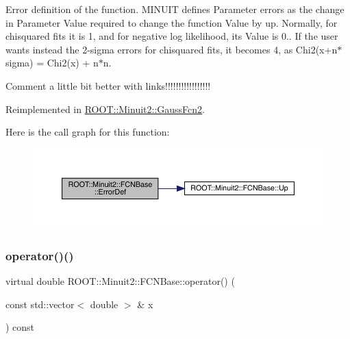 Error definition of the function. M\+I\+N\+U\+IT defines Parameter errors as the change in Parameter Value required to change the function Value by up. Normally, for chisquared fits it is 1, and for negative log likelihood, its Value is 0.. If the user wants instead the 2-\/sigma errors for chisquared fits, it becomes 4, as Chi2(x+n$\ast$sigma) = Chi2(x) + n$\ast$n.

Comment a little bit better with links!!!!!!!!!!!!!!!!! 

Reimplemented in \mbox{\hyperlink{classROOT_1_1Minuit2_1_1GaussFcn2_ac240f7b6ecbb7bf842d786e3914c620a}{R\+O\+O\+T\+::\+Minuit2\+::\+Gauss\+Fcn2}}.

Here is the call graph for this function\+:
\nopagebreak
\begin{figure}[H]
\begin{center}
\leavevmode
\includegraphics[width=350pt]{dd/df4/classROOT_1_1Minuit2_1_1FCNBase_ac4592475c58a65b037ba97ab5f3cba10_cgraph}
\end{center}
\end{figure}
\mbox{\label{classROOT_1_1Minuit2_1_1FCNBase_ae4a86bd94d0d0f5ca6fc8f8ab2bb43cd}} 
\subsubsection{\texorpdfstring{operator()()}{operator()()}\hspace{0.1cm}{\footnotesize\ttfamily [1/2]}}
{\footnotesize\ttfamily virtual double R\+O\+O\+T\+::\+Minuit2\+::\+F\+C\+N\+Base\+::operator() (\begin{DoxyParamCaption}\item[{const std\+::vector$<$ double $>$ \&}]{x }\end{DoxyParamCaption}) const\hspace{0.3cm}{\ttfamily [pure virtual]}}

